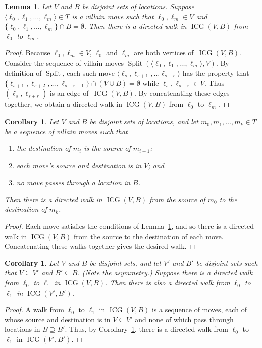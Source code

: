 \documentclass[11pt,letterpaper]{article}
\newcommand{\BreakText}{Split}
\newcommand{\BreakFunc}{\operatorname{\BreakText}}
\newcommand{\Break}[2]{{\BreakFunc({#1}, {#2})}}
\newcommand{\ICG}{\operatorname{ICG}}
\theoremstyle{plain}
\newtheorem{lemma}[theorem]{Lemma}
\newtheorem{corollary}[theorem]{Corollary}
\theoremstyle{definition}
\theoremstyle{remark}
\numberwithin{equation}{section}
\begin{document}
\begin{lemma}
  \label{lem:break-icg}
  Let \(V\) and \(B\) be disjoint sets of locations.
  Suppose \(\langle \ell_0, \ell_1, \ldots, \ell_m \rangle \in T\)
  is a villain move such that
  \(\ell_0,\ell_m \in V\) and
  \(\{\ell_0, \ell_1, \dots, \ell_m\} \cap B = \emptyset\).
  Then there is a directed walk in \(\ICG(V, B)\) from \(\ell_0\) to \(\ell_m\).
\end{lemma}
\begin{proof}
  Because \(\ell_0,\ell_m \in V\),
  \(\ell_0\) and \(\ell_m\) are both vertices of~\(\ICG(V, B)\).
  Consider the sequence of villain moves \(\Break{\langle \ell_0, \ell_1, \ldots, \ell_m \rangle}{V}\).
  By definition of $\BreakFunc$,
  each such move \(\langle \ell_s, \ell_{s+1}, \ldots \ell_{s+r} \rangle\)
  has the property that
  \(\{\ell_{s+1}, \ell_{s+2}, \ldots, \ell_{s+r-1}\} \cap (V \cup B) = \emptyset\)
  while
  \(\ell_s, \ell_{s+r} \in V\).
  Thus \((\ell_s, \ell_{s+r})\) is an edge of~\(\ICG(V, B)\).
  By concatenating these edges together,
  we obtain a directed walk in \(\ICG(V, B)\) from \(\ell_0\) to \(\ell_m\).
\end{proof}
\begin{corollary}
  \label{cor:break-icg-walk}
  Let \(V\) and \(B\) be disjoint sets of locations,
  and let \(m_0, m_1, \ldots, m_k \in T\) be a sequence of villain moves
  such that
  \begin{enumerate}
  \item the destination of \(m_i\) is the source of \(m_{i+1}\);
  \item each move's source and destination is in \(V\); and
  \item no move passes through a location in \(B\).
  \end{enumerate}
  Then there is a directed walk in \(\ICG(V, B)\) from the source of \(m_0\) to the destination of \(m_k\).
\end{corollary}
\begin{proof}
  Each move satisfies the conditions of Lemma~\ref{lem:break-icg},
  and so there is a directed walk in \(\ICG(V, B)\)
  from the source to the destination of each move.
  Concatenating these walks together gives the desired walk.
\end{proof}
\begin{corollary}
  \label{cor:icg-walk-subset}
  Let \(V\) and \(B\) be disjoint sets,
  and let \(V'\) and \(B'\) be disjoint sets
  such that \(V \subseteq V'\) and \(B' \subseteq B\).
  (Note the asymmetry.)
  Suppose there is a directed walk from \(\ell_0\) to \(\ell_1\) in \(\ICG(V, B)\).
  Then there is also a directed walk from \(\ell_0\) to \(\ell_1\) in \(\ICG(V', B')\).
\end{corollary}
\begin{proof}
  A walk from \(\ell_0\) to \(\ell_1\) in \(\ICG(V, B)\)
  is a sequence of moves, each of whose source and destination is in \(V \subseteq V'\)
  and none of which pass through locations in \(B \supseteq B'\).
  Thus, by Corollary~\ref{cor:break-icg-walk},
  there is a directed walk from \(\ell_0\) to \(\ell_1\) in \(\ICG(V', B')\).
\end{proof}
\end{document}
